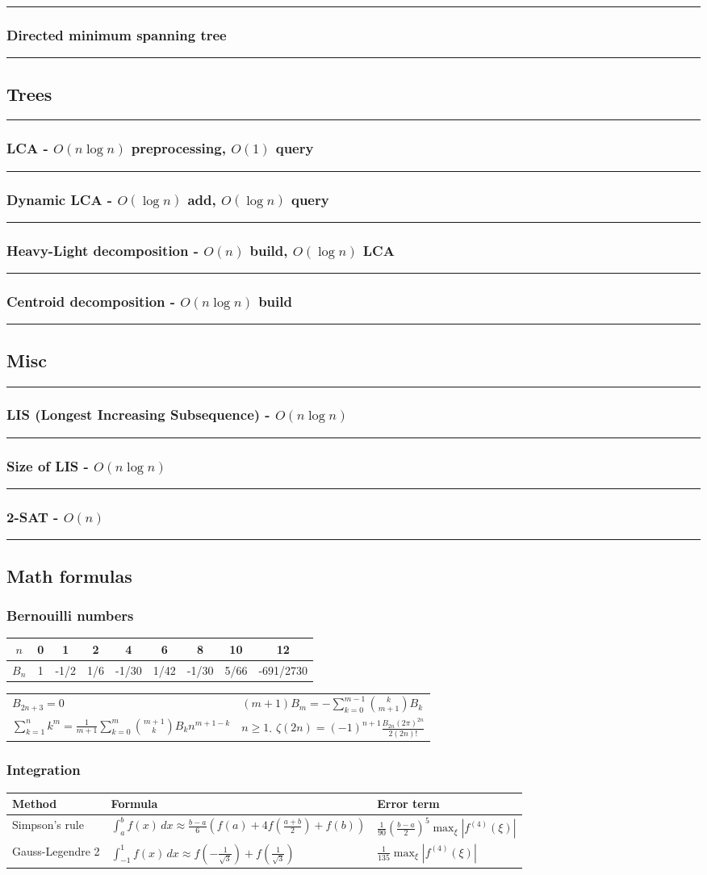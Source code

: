\documentclass[landscape,a4paper,twocolumn,10pt]{report}
\renewcommand{\line}{\noindent\rule{\linewidth}{1pt}}
\newcommand{\algosection}[1]{\line \subsection*{#1}}
\newcommand{\algorithm}[1]{\line \subsubsection*{#1}}
\begin{document}
\algorithm{Directed minimum spanning tree}


\algosection{Trees}
\label{trees}

\algorithm{LCA - $O(n \log n)$ preprocessing, $O(1)$ query}


\algorithm{Dynamic LCA - $O(\log n)$ add, $O(\log n)$ query}


\algorithm{Heavy-Light decomposition - $O(n)$ build, $O(\log n)$ LCA}


\algorithm{Centroid decomposition - $O(n \log n)$ build}



\algosection{Misc}
\label{misc}

\algorithm{LIS (Longest Increasing Subsequence) - $O(n \log n)$}


\algorithm{Size of LIS - $O(n \log n)$}


\algorithm{2-SAT - $O(n)$}


\algosection{Math formulas}
\label{mathformulas}

\subsubsection*{Bernouilli numbers}

\begin{tabular}{|c|c|c|c|c|c|c|c|c|}
\hline
$n$ & 0 & 1 & 2 & 4 & 6 & 8 & 10 & 12\\
\hline
$B_n$ & 1 & -1/2 & 1/6 & -1/30 & 1/42 & -1/30 & 5/66 & -691/2730 \\
\hline
\end{tabular}

\begin{tabular}{@{}ll@{}}
$B_{2n+3} = 0$
&
$(m+1) B_m = - \sum_{k=0}^{m-1}\binom{k}{m+1}B_k$
\\
$\sum_{k=1}^nk^m=\frac{1}{m+1}\sum_{k=0}^m\binom{m+1}{k}B_kn^{m+1-k}$
&
$n\geq 1$. $\zeta(2n) = (-1)^{n+1} \frac{B_{2n} (2\pi)^{2n}}{2(2n)!}$
\end{tabular}
\medskip

\subsubsection*{Integration}

\begin{tabular}{@{}ll|l@{}}
Method & Formula & Error term \\
\hline
Simpson's rule &
$\int_a^b f(x) \, dx \approx \frac{b-a}{6} (f(a) + 4 f(\frac{a+b}{2}) + f(b))$ &
$\frac{1}{90}\left(\frac{b-a}{2}\right)^5 \max_\xi |f^{(4)}(\xi)|$
\\

Gauss-Legendre 2 &
$\int_{-1}^1 f(x) \, dx \approx f(-\frac{1}{\sqrt{3}}) + f(\frac{1}{\sqrt{3}})$ &
$\frac{1}{135} \max_\xi |f^{(4)}(\xi)|$
\end{tabular}
\end{document}
